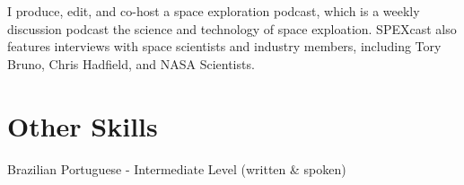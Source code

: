 \documentclass[10pt,final,sans]{resume}
\begin{document}
I produce, edit, and co-host a space exploration podcast, which is a weekly
discussion podcast the science and technology of space exploation. SPEXcast
also features interviews with space scientists and industry members, including
Tory Bruno, Chris Hadfield, and NASA Scientists.

\section{Other Skills}
Brazilian Portuguese - Intermediate Level (written \& spoken)
\end{document}
